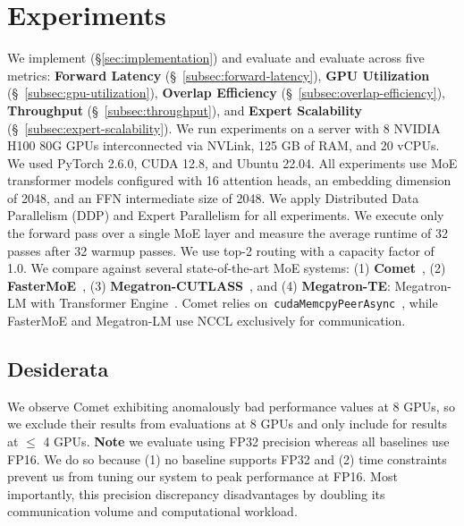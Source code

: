 \section{Experiments}
\label{sec:evaluation}
We implement (\S\ref{sec:implementation}) and evaluate \sysname and evaluate across
five metrics: \textbf{Forward Latency} (\S~\ref{subsec:forward-latency}),
\textbf{GPU Utilization} (\S~\ref{subsec:gpu-utilization}),
\textbf{Overlap Efficiency} (\S~\ref{subsec:overlap-efficiency}),
\textbf{Throughput} (\S~\ref{subsec:throughput}), and \textbf{Expert Scalability} (\S~\ref{subsec:expert-scalability}).
We run experiments on a server with 8 NVIDIA H100 80G GPUs interconnected via NVLink,
125 GB of RAM, and 20 vCPUs. We used PyTorch 2.6.0, CUDA 12.8, and Ubuntu 22.04.
All experiments use MoE transformer models configured with 16 attention heads,
an embedding dimension of 2048, and an FFN intermediate size of 2048.
We apply Distributed Data Parallelism (DDP) and Expert Parallelism for all experiments.
We execute only the forward pass over a single MoE layer and measure the average runtime
of 32 passes after 32 warmup passes.
We use top-2 routing with a capacity factor of 1.0.
We compare \sysname against several state-of-the-art MoE systems:
(1) \textbf{Comet}~\cite{comet}, 
(2) \textbf{FasterMoE}~\cite{fastermoe}, 
(3) \textbf{Megatron-CUTLASS}~\cite{megatron-lm}, and
(4) \textbf{Megatron-TE}: Megatron-LM with Transformer Engine~\cite{transformer-engine}.
Comet relies on~\verb|cudaMemcpyPeerAsync|~\cite{fluxp2p}, while FasterMoE and Megatron-LM use NCCL exclusively for communication.
\subsection{Desiderata}\label{subsec:desiderata}
We observe Comet exhibiting anomalously bad performance values at 8 GPUs,
so we exclude their results from evaluations at 8 GPUs and only include for results at $\leq$
4 GPUs.
\textbf{Note} we evaluate \sysname using FP32 precision whereas all baselines use FP16.
We do so because (1) no baseline supports FP32 and (2) time constraints prevent us from tuning our system
to peak performance at FP16.
Most importantly, this precision discrepancy disadvantages \sysname by doubling its
communication volume and computational workload.
